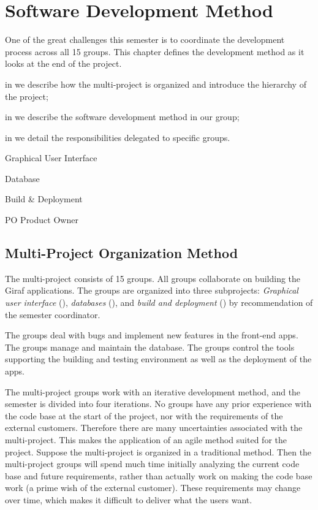 \chapter{Software Development Method}\label{chap:sw_dev_method}
One of the great challenges this semester is to coordinate the development process across all 15 groups. This chapter defines the development method as it looks at the end of the project.

\begin{chapterorganization}
  \item in  we describe how the multi-project is organized and introduce the hierarchy of the project;
  \item in  we describe the software development method in our group;
  \item in  we detail the responsibilities delegated to specific groups.
\end{chapterorganization}

\begin{abbreviations}
  \item[\gui] Graphical User Interface
  \item[\db] Database
  \item[\bd] Build \& Deployment
  \item[PO] Product Owner
\end{abbreviations}

\section{Multi-Project Organization Method}\label{sec:project_overview}
The multi-project consists of 15 groups. All groups collaborate on building the Giraf applications. The groups are organized into three subprojects: \emph{Graphical user interface} (\gui), \emph{databases} (\db), and \emph{build and deployment} (\bd) by recommendation of the semester coordinator.

The \gui groups deal with bugs and implement new features in the front-end apps. The \db groups manage and maintain the database. The \bd groups control the tools supporting the building and testing environment as well as the deployment of the apps.

The multi-project groups work with an iterative development method, and the semester is divided into four iterations. No groups have any prior experience with the code base at the start of the project, nor with the requirements of the external customers. Therefore there are many uncertainties associated with the multi-project. This makes the application of an agile method suited for the project. Suppose the multi-project is organized in a traditional method. Then the multi-project groups will spend much time initially analyzing the current code base and future requirements, rather than actually work on making the code base work (a prime wish of the external customer). These requirements may change over time, which makes it difficult to deliver what the users want.

